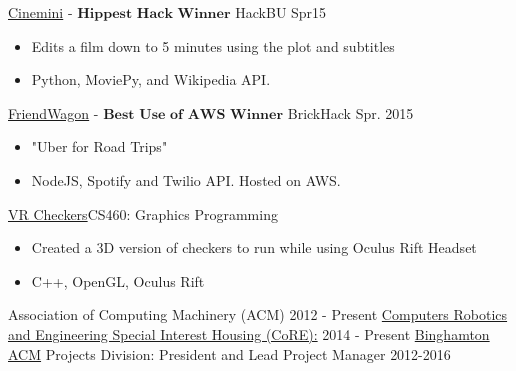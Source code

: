 \documentclass[11pt]{article}
\begin{document}
\projects
{{\href{https://github.com/gabeochoa/Cinemini}{Cinemini}} - $\textbf{Hippest Hack Winner}$ }{HackBU Spr15}
{
    \begin{itemize}[label={}]
    	\setlength\itemsep{.005ex}
        \item{Edits a film down to 5 minutes using the plot and subtitles}
        \item{Python, MoviePy, and Wikipedia API.}
    \end{itemize}
}

\headedsubsection
{{\href{https://github.com/alanplotko/RoadTrip}{FriendWagon}} - $\textbf{Best Use of AWS Winner}$ }
{BrickHack Spr. 2015}
{
    \begin{itemize}[label={}]
    	\setlength\itemsep{.005ex}
        \item{"Uber for Road Trips"}
        \item{NodeJS, Spotify and Twilio API. Hosted on AWS.}
    \end{itemize}
}

\headedsubsection
{\href{}{VR Checkers}}{CS460: Graphics Programming}
{
    \begin{itemize}[label={}]
    	\setlength\itemsep{.005ex}
        \item{Created a 3D version of checkers to run while using Oculus Rift Headset}
        \item{C++, OpenGL, Oculus Rift}
    \end{itemize}
}
\spacedhrule{0.1em}{0.3em}  %

\inlineheadrightdate
{Association of Computing Machinery (ACM)}
{2012 - Present}
\inlineheadrightdate
{\href{http://core.binghamton.edu/}{Computers Robotics and Engineering Special Interest Housing (CoRE):}}
{2014 - Present}
\inlineheadrightdate
{\href{http://binghamtonacm.com/}{Binghamton ACM} Projects Division: President and Lead Project Manager}
{2012-2016}
\end{document}
